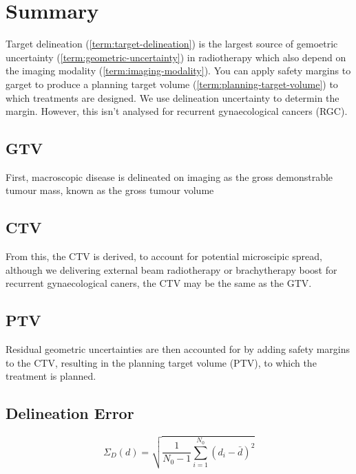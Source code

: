 \documentclass[11pt]{article}
\begin{document}


\tableofcontents

\clearpage

\section{Summary}

Target delineation (\ref{term:target-delineation}) is the largest source of gemoetric uncertainty (\ref{term:geometric-uncertainty}) in radiotherapy which also depend on the imaging modality (\ref{term:imaging-modality}). You can apply safety margins to garget to produce a planning target volume (\ref{term:planning-target-volume}) to which treatments are designed. We use delineation uncertainty to determin the margin. However, this isn't analysed for recurrent gynaecological cancers (RGC).

\subsection{GTV}

First, macroscopic disease is delineated on imaging as the gross demonstrable tumour mass, known as the gross tumour volume

\subsection{CTV}

From this, the CTV is derived, to account for potential microscipic spread, although we delivering external beam radiotherapy or brachytherapy boost for recurrent gynaecological caners, the CTV may be the same as the GTV.

\subsection{PTV}

Residual geometric uncertainties are then accounted for by
adding safety margins to the CTV, resulting in the planning
target volume (PTV), to which the treatment is planned.

\subsection{Delineation Error}

\begin{equation}
    \Sigma_D(d) = \sqrt{\frac{1}{N_0-1}\sum^{N_0}_{i=1}{(d_i - \bar d)^2}} \label{equ:delineation-error}
\end{equation}
\end{document}
